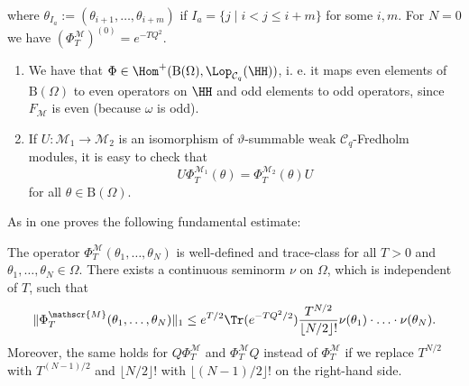 \documentclass[a4paper, english, 12pt, bibliography=totocnumbered,
index=totoc]{scrartcl}
\begin{document}
where $\theta_{I_a}:= (\theta_{i+1} , \dots , \theta_{i+m})$
if $I_a = \{j \mid i < j \leq i+m\}$ for some $i, m$.
For $N = 0$ we have $(\Phi_T^{\mathscr{M}})^{(0)} = e^{-TQ^2}$.
\begin{rem}\label{Remark isomorphism quantm}
	\begin{enumerate}
		\item We have that $\Phi \in \Hom^+(\mathrm{B}(\Omega),
		\Lop_{\mathcal{C}_q}(\HH))$, i. e. it maps even elements of
		$\mathrm{B}(\Omega)$ to even operators on $\HH$ and odd elements to
		odd operators, since $F_{\mathscr{M}}$ is even (because $\omega$ is
		odd).
		\item\label{Item 3} If $U \colon \mathscr{M}_1 \to \mathscr{M}_2$ is
		an isomorphism
		of $\vartheta$-summable weak $\mathcal{C}_q$-Fredholm modules, it is
		easy to check that
		\begin{equation*}
			U \Phi_T^{\mathscr{M}_1}(\theta) = \Phi_T^{\mathscr{M}_2}(\theta)
			U
		\end{equation*}
		for all $\theta \in \mathrm{B}(\Omega)$.
	\end{enumerate}
\end{rem}
As in \cite[Theorem 4.6]{GüneysuLudewig} one proves the following fundamental
estimate:
\begin{thm}\label{Fundamental estimate}
	The operator $\Phi_{T}^{\mathscr{M}}(\theta_1, \ldots, \theta_N)$ is 
	well-defined and trace-class for all $T > 0$ and $\theta_1, \ldots, 
	\theta_N \in \Omega$.
	There exists a continuous seminorm $\nu$ on $\Omega$, which is independent
	of $T$, such that
	\begin{equation*}
		\lVert \Phi_{T}^{\mathscr{M}}(\theta_1, \ldots, \theta_N) \rVert_1
		\leq
		e^{T/2} \Tr(e^{-TQ^2/2}) \frac{T^{N/2}}{\lfloor N/2 \rfloor!}
		\nu(\theta_1) \cdot \ldots \cdot \nu(\theta_N).
	\end{equation*}
	Moreover, the same holds for $Q \Phi_{T}^{\mathscr{M}}$ and
	$\Phi_T^{\mathscr{M}} Q$ instead of $\Phi_T^{\mathscr{M}}$ if we replace
	$T^{N/2}$ with $T^{(N-1)/2}$ and $\lfloor N/2\rfloor!$ with $\lfloor
	(N-1)/2 \rfloor!$ on the right-hand side.
\end{thm}
\end{document}
